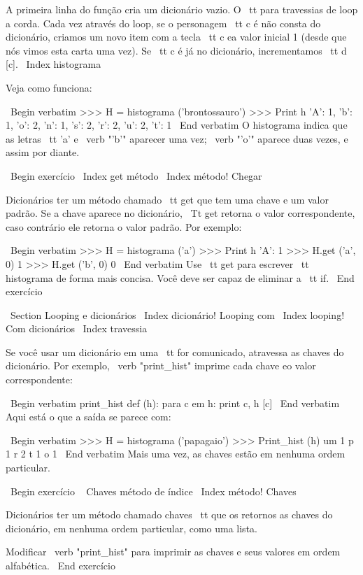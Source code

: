 \documentclass[10pt]{book}
\begin{document}
{{{{{{{A primeira linha do
função cria um dicionário vazio. O {\ tt para} travessias de loop
a corda. Cada vez através do loop, se o personagem {\ tt c} é
não consta do dicionário, criamos um novo item com a tecla {\ tt c} ea
valor inicial 1 (desde que nós vimos esta carta uma vez). Se {\ tt c} é
já no dicionário, incrementamos {\ tt d [c]}.
\ Index {} histograma

Veja como funciona:

\ Begin {verbatim}
>>> H = histograma ('brontossauro')
>>> Print h
{'A': 1, 'b': 1, 'o': 2, 'n': 1, 's': 2, 'r': 2, 'u': 2, 't': 1}
\ End {verbatim}
%
O histograma indica que as letras {\ tt 'a'} e \ verb "'b'"
aparecer uma vez; \ verb "'o'" aparece duas vezes, e assim por diante.

\ Begin {} exercício
\ Index {get método}
\ Index {método! Chegar}

Dicionários ter um método chamado {\ tt get} que tem uma chave
e um valor padrão. Se a chave aparece no dicionário,
{\ Tt get} retorna o valor correspondente, caso contrário ele retorna
o valor padrão. Por exemplo:

\ Begin {verbatim}
>>> H = histograma ('a')
>>> Print h
{'A': 1}
>>> H.get ('a', 0)
1
>>> H.get ('b', 0)
0
\ End {verbatim}
%
Use {\ tt get} para escrever {\ tt histograma} de forma mais concisa. Você
deve ser capaz de eliminar a {\ tt if}.
\ End {} exercício


\ Section {Looping e dicionários}
\ Index {dicionário! Looping com}
\ Index {looping! Com dicionários}
\ Index {travessia}

Se você usar um dicionário em uma {\ tt for} comunicado, atravessa
as chaves do dicionário. Por exemplo, \ verb "print_hist"
imprime cada chave eo valor correspondente:

\ Begin {verbatim}
print_hist def (h):
    para c em h:
        print c, h [c]
\ End {verbatim}
%
Aqui está o que a saída se parece com:

\ Begin {verbatim}
>>> H = histograma ('papagaio')
>>> Print_hist (h)
um 1
p 1
r 2
t 1
o 1
\ End {verbatim}
%
Mais uma vez, as chaves estão em nenhuma ordem particular.

\ Begin {} exercício
\ {} Chaves método de índice
\ Index {método! Chaves}

Dicionários ter um método chamado {chaves \ tt} que os retornos
as chaves do dicionário, em nenhuma ordem particular, como uma lista.

Modificar \ verb "print_hist" para imprimir as chaves e seus valores
em ordem alfabética.
\ End {} exercício



}}}}}}}
\end{document}
